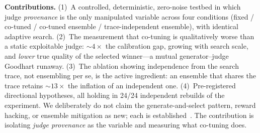 \documentclass[sigconf]{acmart}
\begin{document}
\textbf{Contributions.} (1)~A controlled, deterministic, zero-noise testbed in which judge \emph{provenance} is the only manipulated variable across four conditions (fixed / co-tuned / co-tuned ensemble / trace-independent ensemble), with identical adaptive search. (2)~The measurement that co-tuning is qualitatively worse than a static exploitable judge: ${\sim}4\times$ the calibration gap, growing with search scale, and \emph{lower} true quality of the selected winner---a mutual generator--judge Goodhart runaway. (3)~The ablation showing independence from the search trace, not ensembling per se, is the active ingredient: an ensemble that shares the trace retains ${\sim}13\times$ the inflation of an independent one. (4)~Pre-registered directional hypotheses, all holding in 24/24 independent rebuilds of the experiment. We deliberately do not claim the generate-and-select pattern, reward hacking, or ensemble mitigation as new; each is established~\cite{gao2023,coste2024,itrh2025}. The contribution is isolating \emph{judge provenance} as the variable and measuring what co-tuning does.
\end{document}
